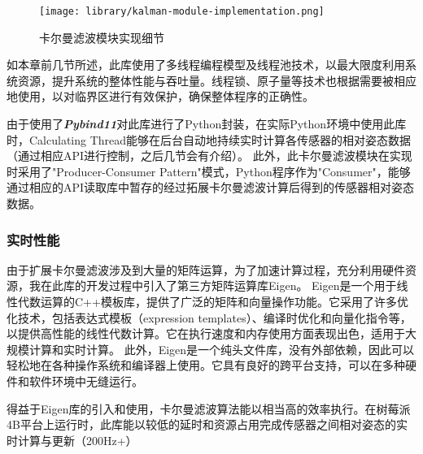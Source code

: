 \begin{figure}[H]
    \centering
    \texttt{[image: library/kalman-module-implementation.png]}
    \caption{\label{fig:kalman-module-implementation}卡尔曼滤波模块实现细节}
\end{figure}

如本章前几节所述，此库使用了多线程编程模型及线程池技术，以最大限度利用系统资源，提升系统的整体性能与吞吐量。线程锁、原子量等技术也根据需要被相应地使用，以对临界区进行有效保护，确保整体程序的正确性。

由于使用了{\bfseries \itshape Pybind11}对此库进行了Python封装，在实际Python环境中使用此库时，Calculating Thread能够在后台自动地持续实时计算各传感器的相对姿态数据（通过相应API进行控制，之后几节会有介绍）。
此外，此卡尔曼滤波模块在实现时采用了"Producer-Consumer Pattern"模式，Python程序作为"Consumer"，能够通过相应的API读取库中暂存的经过拓展卡尔曼滤波计算后得到的传感器相对姿态数据。

\subsubsection{实时性能}
由于扩展卡尔曼滤波涉及到大量的矩阵运算，为了加速计算过程，充分利用硬件资源，我在此库的开发过程中引入了第三方矩阵运算库Eigen。
Eigen是一个用于线性代数运算的C++模板库，提供了广泛的矩阵和向量操作功能。它采用了许多优化技术，包括表达式模板（expression templates）、编译时优化和向量化指令等，以提供高性能的线性代数计算。它在执行速度和内存使用方面表现出色，适用于大规模计算和实时计算。
此外，Eigen是一个纯头文件库，没有外部依赖，因此可以轻松地在各种操作系统和编译器上使用。它具有良好的跨平台支持，可以在多种硬件和软件环境中无缝运行。

得益于Eigen库的引入和使用，卡尔曼滤波算法能以相当高的效率执行。在树莓派4B平台上运行时，此库能以较低的延时和资源占用完成传感器之间相对姿态的实时计算与更新（200Hz+）

